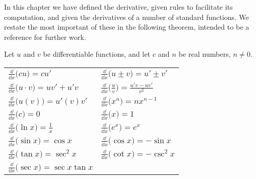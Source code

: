 

In this chapter we have defined the derivative, given rules to facilitate its computation, and given the derivatives of a number of standard functions. We restate the most important of these in the following theorem, intended to be a reference for further work.

\begin{theorem}\label{thm:deriv_glossary}%
Let $u$ and $v$ be differentiable functions, and let $c$ and $n$ be real numbers, $n\neq 0$. \\
\begin{anywhereenum}
\renewcommand{\arraystretch}{1.6}
\begin{tabular}{ll}
	\item		$\frac{\dd}{\dd x}\bigl(cu\bigr) = cu'$ &
	\item		$\frac{\dd}{\dd x}\bigl(u\pm v\bigr) = u'\pm v'$ \\
	\item		$\frac{\dd}{\dd x}\bigl(u\cdot v\bigr) = uv'+u'v$ &
	\item		$\frac{\dd}{\dd x}\bigl(\frac uv\bigr) = \frac{u'v-uv'}{v^2}$ \\
	\item		$\frac{\dd}{\dd x}\bigl(u(v)\bigr) = u'(v)v'$ &
	\item		$\frac{\dd}{\dd x}\bigl(x^n\bigr) = nx^{n-1}$ \\
	\item		$\frac{\dd}{\dd x}\bigl(c\bigr) = 0$ &
	\item		$\frac{\dd}{\dd x}\bigl(x\bigr) = 1$ \\
	\item		$\frac{\dd}{\dd x}\bigl(\ln x\bigr) = \frac{1}{x}$ &
	\item		$\frac{\dd}{\dd x}\bigl(e^x\bigr) = e^x$ \\
	\item		$\frac{\dd}{\dd x}\bigl(\sin x\bigr) = \cos x$ &
	\item		$\frac{\dd}{\dd x}\bigl(\cos x\bigr) = -\sin x$ \\
	\item		$\frac{\dd}{\dd x}\bigl(\tan x\bigr) = \sec^2x$ &
	\item		$\frac{\dd}{\dd x}\bigl(\cot x\bigr) = -\csc^2x$ \\
	\item		$\frac{\dd}{\dd x}\bigl(\sec x\bigr) = \sec x\tan x$\qquad\null &

\end{tabular}
\end{anywhereenum}
\end{theorem}
